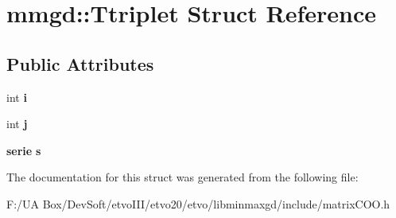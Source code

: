 \section{mmgd\+:\+:Ttriplet Struct Reference}
\label{structmmgd_1_1_ttriplet}
\subsection*{Public Attributes}
\begin{DoxyCompactItemize}
\item 
\mbox{\label{structmmgd_1_1_ttriplet_ac7ec026d6bf7f80a43b05c2938b3e2e9}} 
int {\bfseries i}
\item 
\mbox{\label{structmmgd_1_1_ttriplet_ac18a76e6579541c5a2bd86cd45e4af97}} 
int {\bfseries j}
\item 
\mbox{\label{structmmgd_1_1_ttriplet_a3cd82efd337410a589e2a6250eb85245}} 
\textbf{ serie} {\bfseries s}
\end{DoxyCompactItemize}


The documentation for this struct was generated from the following file\+:\begin{DoxyCompactItemize}
\item 
F\+:/\+U\+A Box/\+Dev\+Soft/etvo\+I\+I\+I/etvo20/etvo/libminmaxgd/include/matrix\+C\+O\+O.\+h\end{DoxyCompactItemize}
